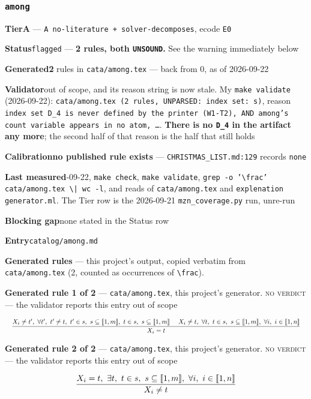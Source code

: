 \documentclass[10pt,a4paper]{article}
\newcommand{\entryfield}[2]{{\raggedright\textbf{#1}\quad #2\par}}
\newcommand{\rulebox}[1]{%
  \[\resizebox{\ifdim\width>\linewidth\linewidth\else\width\fi}{!}%
    {$\displaystyle #1$}\]}
\begin{document}
\subsubsection*{\texttt{among}}
\label{entry:among}
\entryfield{Tier}{\textbf{A} --- \texttt{A no-\allowbreak{}literature + solver-\allowbreak{}decomposes}, ecode \texttt{E0}}
\entryfield{Status}{\texttt{flagged} --- \textbf{2 rules, both \texttt{UNSOUND}.} See the warning immediately below}
\entryfield{Generated}{\textbf{2} rules in \texttt{cata/among.tex} --- back from 0, as of 2026-09-22}
\entryfield{Validator}{out of scope, and its reason string is now stale. My \texttt{make validate} (2026-09-22): \texttt{cata/\allowbreak{}among.\allowbreak{}tex (2 rules, UNPARSED: index set: s)}, reason \texttt{index set D\_\allowbreak{}4 is never defined by the printer (W1-\allowbreak{}T2), AND among's count variable appears in no atom, \ldots{}}. \textbf{There is no \texttt{D\_4} in the artifact any more}; the second half of that reason is the half that still holds}
\entryfield{Calibration}{\textbf{no published rule exists} --- \texttt{CHRISTMAS\_LIST.md:129} records \texttt{none}}
\entryfield{Last measured}{2026-09-22, \texttt{make check}, \texttt{make validate}, \texttt{grep -\allowbreak{}o '\textbackslash{}frac' cata/\allowbreak{}among.\allowbreak{}tex \textbackslash{}| wc -\allowbreak{}l}, and reads of \texttt{cata/among.tex} and \texttt{explenation generator.ml}. The Tier row is the 2026-09-21 \texttt{mzn\_coverage.py} run, unre-run}
\entryfield{Blocking gap}{none stated in the Status row}
\entryfield{Entry}{\texttt{catalog/among.md}}

\textbf{Generated rules} --- this project's output, copied verbatim from \texttt{cata/among.tex} (2, counted as occurrences of \texttt{\textbackslash{}frac}).\par

{\small\textbf{Generated rule 1 of 2} --- \texttt{cata/among.tex}, this project's generator. \textsc{no verdict} --- the validator reports this entry out of scope\par}
\rulebox{\frac{X_{i} \neq t',~\forall t',~t' \neq t,~t' \in s,~s \subseteq \llbracket1,m\rrbracket,~t \in s,~s \subseteq \llbracket1,m\rrbracket~~~~X_{i} \neq t,~\forall t,~t \in s,~s \subseteq \llbracket1,m\rrbracket,~\forall i,~i \in \llbracket1,n\rrbracket}{X_{i}=t}}

{\small\textbf{Generated rule 2 of 2} --- \texttt{cata/among.tex}, this project's generator. \textsc{no verdict} --- the validator reports this entry out of scope\par}
\rulebox{\frac{X_{i}=t,~\exists t,~t \in s,~s \subseteq \llbracket1,m\rrbracket,~\forall i,~i \in \llbracket1,n\rrbracket}{X_{i} \neq t}}
\end{document}
